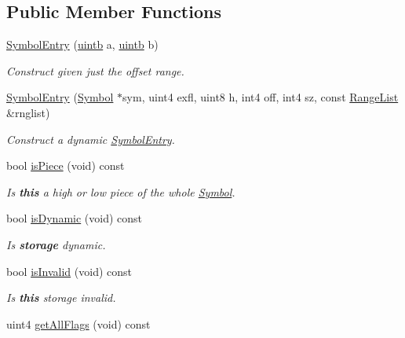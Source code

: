\subsection*{Public Member Functions}
\begin{DoxyCompactItemize}
\item 
\mbox{\hyperlink{class_symbol_entry_a50c0100d619041b6e485e7ec533fc2b8}{Symbol\+Entry}} (\mbox{\hyperlink{types_8h_a2db313c5d32a12b01d26ac9b3bca178f}{uintb}} a, \mbox{\hyperlink{types_8h_a2db313c5d32a12b01d26ac9b3bca178f}{uintb}} b)
\begin{DoxyCompactList}\small\item\em Construct given just the offset range. \end{DoxyCompactList}\item 
\mbox{\hyperlink{class_symbol_entry_a1233239187212ed427a718aae75e524c}{Symbol\+Entry}} (\mbox{\hyperlink{class_symbol}{Symbol}} $\ast$sym, uint4 exfl, uint8 h, int4 off, int4 sz, const \mbox{\hyperlink{class_range_list}{Range\+List}} \&rnglist)
\begin{DoxyCompactList}\small\item\em Construct a dynamic \mbox{\hyperlink{class_symbol_entry}{Symbol\+Entry}}. \end{DoxyCompactList}\item 
bool \mbox{\hyperlink{class_symbol_entry_a13c0e084b4c66443250ecf145f43d2e2}{is\+Piece}} (void) const
\begin{DoxyCompactList}\small\item\em Is {\bfseries{this}} a high or low piece of the whole \mbox{\hyperlink{class_symbol}{Symbol}}. \end{DoxyCompactList}\item 
bool \mbox{\hyperlink{class_symbol_entry_a30c4c7a954f6d5d4bc0e50d78b16077e}{is\+Dynamic}} (void) const
\begin{DoxyCompactList}\small\item\em Is {\bfseries{storage}} {\itshape dynamic}. \end{DoxyCompactList}\item 
bool \mbox{\hyperlink{class_symbol_entry_ab519054ccea76aae98ec280ab051a6ea}{is\+Invalid}} (void) const
\begin{DoxyCompactList}\small\item\em Is {\bfseries{this}} storage {\itshape invalid}. \end{DoxyCompactList}\item 
uint4 \mbox{\hyperlink{class_symbol_entry_a2a9a19cc7c6bfa573fd244bcc061a4a4}{get\+All\+Flags}} (void) const

\end{DoxyCompactItemize}
